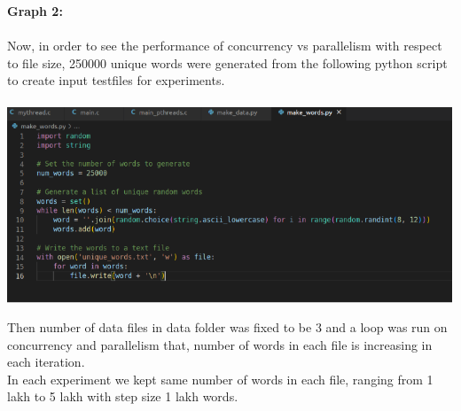 \documentclass[12pt]{article}
\begin{document}
\begin{spacing}{1.2}
\textbf{Graph 2:}\\
\\
Now, in order to see the performance of concurrency vs parallelism with respect to file size, 250000 unique words were generated from the following python script to create input testfiles for experiments.\\
\\
\includegraphics[width=14cm]{images/34.png}\\
\newpage

Then number of data files in data folder was fixed to be 3 and a loop was run on concurrency and parallelism that, number of words in each file is increasing in each iteration. \\
In each experiment we kept same number of words in each file, ranging from 1 lakh to 5 lakh with step size 1 lakh words.\\


\end{spacing}
\end{document}
